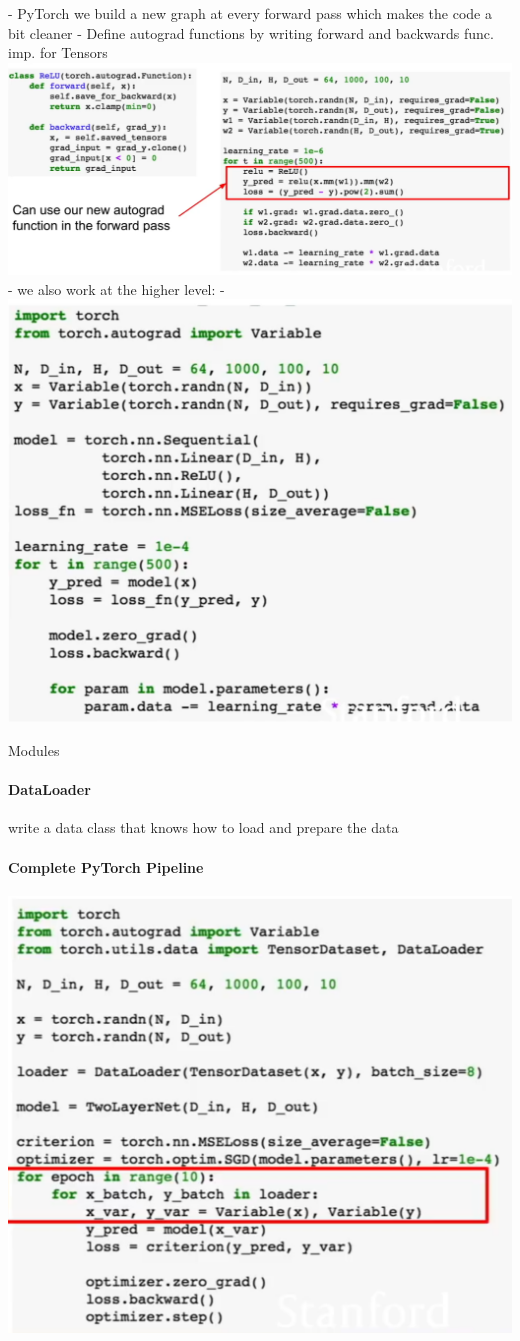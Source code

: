 - PyTorch we build a new graph at every forward pass which makes the code a bit cleaner
- Define autograd functions by writing forward and backwards func. imp. for Tensors\includegraphics[width=0.5\columnwidth]{fei_fei_li/lecture_08/pytorch_autograd.png}
- we also work at the higher level:
- \includegraphics[width=0.5\columnwidth]{fei_fei_li/lecture_08/pytorch_nn.png}



Modules



\paragraph{DataLoader }

write a data class that knows how to load and prepare the data



\paragraph{Complete PyTorch Pipeline}

\includegraphics[width=0.5\columnwidth]{fei_fei_li/lecture_08/complete_pytorch_pipeline.png}

